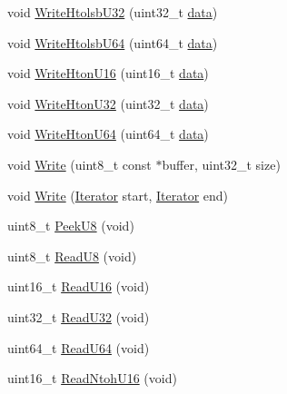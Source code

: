 \begin{DoxyCompactItemize}
\item 
void \hyperlink{classns3_1_1Buffer_1_1Iterator_a4c72d9724c68f45909a25b16de818655}{Write\+Htolsb\+U32} (uint32\+\_\+t \hyperlink{topology-example-sim_8cc_a26c65296e316af77b787dc77469bb2a4}{data})
\item 
void \hyperlink{classns3_1_1Buffer_1_1Iterator_a930c087b76db8b535f224b4eb916c359}{Write\+Htolsb\+U64} (uint64\+\_\+t \hyperlink{topology-example-sim_8cc_a26c65296e316af77b787dc77469bb2a4}{data})
\item 
void \hyperlink{classns3_1_1Buffer_1_1Iterator_a97ea9c86cfe87b516efc28faa7dfdf21}{Write\+Hton\+U16} (uint16\+\_\+t \hyperlink{topology-example-sim_8cc_a26c65296e316af77b787dc77469bb2a4}{data})
\item 
void \hyperlink{classns3_1_1Buffer_1_1Iterator_ac8a95d099acc1fa0e699200b4de82173}{Write\+Hton\+U32} (uint32\+\_\+t \hyperlink{topology-example-sim_8cc_a26c65296e316af77b787dc77469bb2a4}{data})
\item 
void \hyperlink{classns3_1_1Buffer_1_1Iterator_a2d6eb710a2300eabe1dd0e9698770966}{Write\+Hton\+U64} (uint64\+\_\+t \hyperlink{topology-example-sim_8cc_a26c65296e316af77b787dc77469bb2a4}{data})
\item 
void \hyperlink{classns3_1_1Buffer_1_1Iterator_a087b4e6b5d038544c750c741e8932d69}{Write} (uint8\+\_\+t const $\ast$buffer, uint32\+\_\+t size)
\item 
void \hyperlink{classns3_1_1Buffer_1_1Iterator_aa10bf49922695a4153d1ecec60799a1c}{Write} (\hyperlink{classns3_1_1Buffer_1_1Iterator}{Iterator} start, \hyperlink{classns3_1_1Buffer_1_1Iterator}{Iterator} end)
\item 
uint8\+\_\+t \hyperlink{classns3_1_1Buffer_1_1Iterator_aeba1e13bebc9775be31e37baf9e75a73}{Peek\+U8} (void)
\item 
uint8\+\_\+t \hyperlink{classns3_1_1Buffer_1_1Iterator_a7d7d5299e27ecf41aef37e315984ad5a}{Read\+U8} (void)
\item 
uint16\+\_\+t \hyperlink{classns3_1_1Buffer_1_1Iterator_a73b0df87d8f3ca52c6c87898d420da13}{Read\+U16} (void)
\item 
uint32\+\_\+t \hyperlink{classns3_1_1Buffer_1_1Iterator_adceeb0fd38c2f5634492b64a8e344ff2}{Read\+U32} (void)
\item 
uint64\+\_\+t \hyperlink{classns3_1_1Buffer_1_1Iterator_aba1fa5272c0fa3455f59a70db5c9d976}{Read\+U64} (void)
\item 
uint16\+\_\+t \hyperlink{classns3_1_1Buffer_1_1Iterator_a14d63ac76497032a473d99cc8458608e}{Read\+Ntoh\+U16} (void)
\item 

\end{DoxyCompactItemize}
